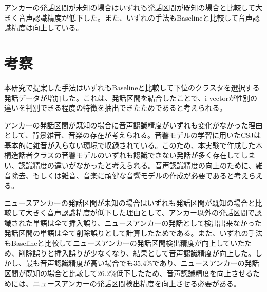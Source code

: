 アンカーの発話区間が未知の場合はいずれも発話区間が既知の場合と比較して大きく音声認識精度が低下した。また、いずれの手法もBaselineと比較して音声認識精度は向上している。

\section{考察}
本研究で提案した手法はいずれもBaselineと比較して下位のクラスタを選択する発話データが増加した。これは、発話区間を結合したことで、i-vectorが性別の違いを判別できる程度の特徴を抽出できたためであると考えられる。\par
アンカーの発話区間が既知の場合に音声認識精度がいずれも変化がなかった理由として、背景雑音、音楽の存在が考えられる。音響モデルの学習に用いたCSJは基本的に雑音が入らない環境で収録されている。このため、本実験で作成した木構造話者クラスの音響モデルのいずれも認識できない発話が多く存在してしまい、認識精度の違いがなかったと考えられる。音声認識精度の向上のために、雑音除去、もしくは雑音、音楽に頑健な音響モデルの作成が必要であると考えらえる。\par
ニュースアンカーの発話区間が未知の場合はいずれも発話区間が既知の場合と比較して大きく音声認識精度が低下した理由として、アンカー以外の発話区間で認識された単語は全て挿入誤り、ニュースアンカーの発話として検出出来なかった発話区間の単語は全て削除誤りとして計算したためである。また、いずれの手法もBaselineと比較してニュースアンカーの発話区間検出精度が向上していたため、削除誤りと挿入誤りが少なくなり、結果として音声認識精度が向上した。しかし、最も音声認識精度が高い場合でも35.4\%であり、ニュースアンカーの発話区間が既知の場合と比較して26.2\%低下したため、音声認識精度を向上させるためには、ニュースアンカーの発話区間検出精度を向上させる必要がある。

